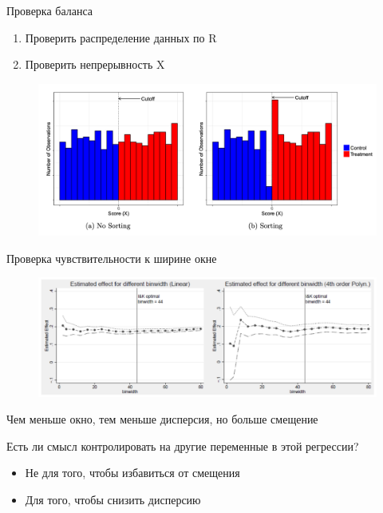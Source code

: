 \begin{frame}{Проверка баланса}
    \begin{enumerate}
        \item Проверить распределение данных по R
        \item Проверить непрерывность X 
    \end{enumerate}
    \begin{figure}
        \centering
        \includegraphics[width=\textwidth]{Images/rdd_density.png}
    \end{figure}
\end{frame}

\begin{frame}{Проверка чувствительности к ширине окне}
    \begin{figure}
        \centering
        \includegraphics[width=\textwidth]{Images/rdd_sensitivity.png}
    \end{figure}
    Чем меньше окно, тем меньше дисперсия, но больше смещение
\end{frame}




\begin{frame}{Есть ли смысл контролировать на другие переменные в этой регрессии?}
\begin{itemize}
    \item Не для того, чтобы избавиться от смещения
    \item Для того, чтобы снизить дисперсию
\end{itemize}
\end{frame}

